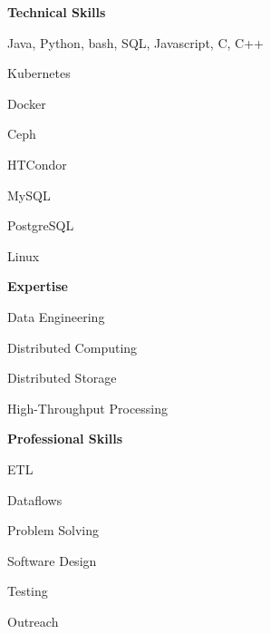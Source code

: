 \documentclass[12pt]{article}
\newcommand{\notexperience}[2]{%
  \medskip
  {\color{colorsection}{#1} {\large \textbf{#2}}}}
\begin{document}
\begin{minipage}[t]{0.29\linewidth}

  \notexperience{\faTasks}{Technical Skills}

  \medskip

  Java, Python, bash, SQL, Javascript, C, C++

  \medskip

  Kubernetes

  \medskip

  Docker

  \medskip

  Ceph

  \medskip

  HTCondor

  \medskip

  MySQL

  \medskip

  PostgreSQL

  \medskip

  Linux

  \bigskip
  \bigskip

  \notexperience{\faUserNinja}{Expertise}

  \medskip
  
  Data Engineering

  \medskip
  
  Distributed Computing

  \medskip

  Distributed Storage

  \medskip

  High-Throughput Processing

  \bigskip
  \bigskip

  \notexperience{\faToolbox}{Professional Skills}

  \medskip

  ETL

  \medskip

  Dataflows

  \medskip

  Problem Solving

  \medskip

  Software Design

  \medskip

  Testing
  
  \medskip

  Outreach

\end{minipage}\hfill
\end{document}
